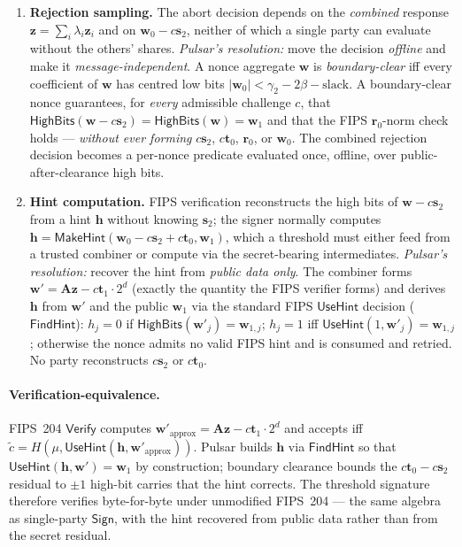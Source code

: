 \begin{enumerate}[nosep]
  \item \textbf{Rejection sampling.}  The abort decision depends on the
    \emph{combined} response $\mathbf{z} = \sum_i \lambda_i \mathbf{z}_i$
    and on $\mathbf{w}_0 - c\mathbf{s}_2$, neither of which a single
    party can evaluate without the others' shares.  \emph{Pulsar's
    resolution:} move the decision \emph{offline} and make it
    \emph{message-independent}.  A nonce aggregate $\mathbf{w}$ is
    \emph{boundary-clear} iff every coefficient of $\mathbf{w}$ has
    centred low bits $|\mathbf{w}_0| < \gamma_2 - 2\beta -
    \text{slack}$.  A boundary-clear nonce guarantees, for \emph{every}
    admissible challenge $c$, that
    $\mathsf{HighBits}(\mathbf{w} - c\mathbf{s}_2) =
    \mathsf{HighBits}(\mathbf{w}) = \mathbf{w}_1$ and that the FIPS
    $\mathbf{r}_0$-norm check holds --- \emph{without ever forming}
    $c\mathbf{s}_2$, $c\mathbf{t}_0$, $\mathbf{r}_0$, or $\mathbf{w}_0$.
    The combined rejection decision becomes a per-nonce predicate
    evaluated once, offline, over public-after-clearance high bits.

  \item \textbf{Hint computation.}  FIPS verification reconstructs the
    high bits of $\mathbf{w} - c\mathbf{s}_2$ from a hint $\mathbf{h}$
    without knowing $\mathbf{s}_2$; the signer normally computes
    $\mathbf{h} = \mathsf{MakeHint}(\mathbf{w}_0 - c\mathbf{s}_2 +
    c\mathbf{t}_0, \mathbf{w}_1)$, which a threshold must either feed
    from a trusted combiner or compute via the secret-bearing
    intermediates.  \emph{Pulsar's resolution:} recover the hint from
    \emph{public data only}.  The combiner forms
    $\mathbf{w}' = \mathbf{A}\mathbf{z} - c\mathbf{t}_1 \cdot 2^d$
    (exactly the quantity the FIPS verifier forms) and derives
    $\mathbf{h}$ from $\mathbf{w}'$ and the public $\mathbf{w}_1$ via the
    standard FIPS $\mathsf{UseHint}$ decision ($\mathsf{FindHint}$):
    $h_j = 0$ if $\mathsf{HighBits}(\mathbf{w}'_j) = \mathbf{w}_{1,j}$;
    $h_j = 1$ iff $\mathsf{UseHint}(1, \mathbf{w}'_j) = \mathbf{w}_{1,j}$;
    otherwise the nonce admits no valid FIPS hint and is consumed and
    retried.  No party reconstructs $c\mathbf{s}_2$ or $c\mathbf{t}_0$.
\end{enumerate}

\paragraph{Verification-equivalence.}  FIPS~204 $\mathsf{Verify}$
computes $\mathbf{w}'_{\text{approx}} = \mathbf{A}\mathbf{z} -
c\mathbf{t}_1 \cdot 2^d$ and accepts iff $\tilde c =
H(\mu, \mathsf{UseHint}(\mathbf{h}, \mathbf{w}'_{\text{approx}}))$.
Pulsar builds $\mathbf{h}$ via $\mathsf{FindHint}$ so that
$\mathsf{UseHint}(\mathbf{h}, \mathbf{w}') = \mathbf{w}_1$ by
construction; boundary clearance bounds the $c\mathbf{t}_0 -
c\mathbf{s}_2$ residual to $\pm 1$ high-bit carries that the hint
corrects.  The threshold signature therefore verifies byte-for-byte
under unmodified FIPS~204 --- the same algebra as single-party
$\mathsf{Sign}$, with the hint recovered from public data rather than
from the secret residual.


